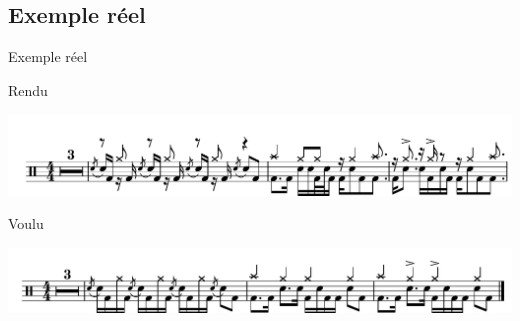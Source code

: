\documentclass{beamer}
\begin{document}
\subsection{Exemple réel}

\begin{frame}{Exemple réel}
    \begin{block}{Rendu}
        \begin{center}
            \includegraphics[width=\textwidth]{figures/nirvana.pdf}
        \end{center}
    \end{block}
    \begin{block}{Voulu}
        \begin{center}
            \includegraphics[width=\textwidth]{figures/voulu.pdf}
        \end{center}
    \end{block}
\end{frame}
\end{document}
